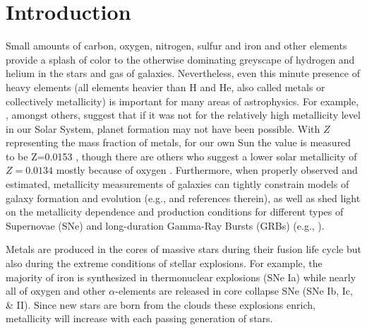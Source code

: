 \documentclass{emulateapj}
\begin{document}
\section{Introduction}
Small amounts of carbon, oxygen, nitrogen, sulfur and iron and
 other elements provide a splash of color to the otherwise dominating greyscape of hydrogen and helium in the stars and gas of galaxies. Nevertheless, even this minute presence of heavy elements (all elements heavier than H and He, also called metals or collectively metallicity) is important for many areas of astrophysics. For example, \citet{johnson12}, amongst others, 
suggest that if it was not for the relatively high metallicity level in our Solar System, planet formation may not have been possible. With $Z$ representing the mass fraction of metals, for our own Sun the value is measured to be  Z=0.0153 \citep{chaffau11}, though there are others who suggest a lower solar metallicity of $Z=0.0134$ mostly because of oxygen \citep{asplund09_rev,grevesse10}.%
Furthermore, when properly observed and estimated, metallicity measurements of galaxies can tightly constrain models of galaxy formation and evolution (e.g., \citealt{kewley08} and references therein), as well as shed light on the metallicity dependence and production conditions for different types of Supernovae (SNe) and long-duration Gamma-Ray Bursts (GRBs) (e.g., \citealt{modjaz08_Z,levesque10_grbhosts,anderson10,modjaz11,kelly12,sanders12,lunnan14,leloudas14,pan14}).

Metals are produced in the cores of massive stars during their fusion life cycle but also during the extreme conditions of stellar explosions. For example, the majority of iron is synthesized in thermonuclear explosions (SNe Ia) while nearly all of oxygen and other $\alpha$-elements are released in core collapse SNe (SNe Ib, Ic, \& II). Since new stars are born from the clouds these explosions enrich, metallicity will increase with each passing generation of stars. 
\end{document}
